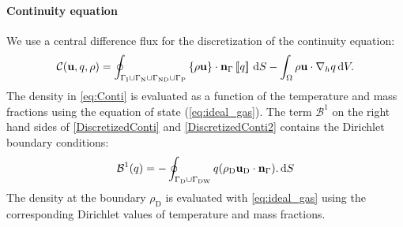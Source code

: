 \paragraph{Continuity equation}
We use a central difference flux for the discretization of the continuity equation:
\begin{equation}
	\mathcal{C}(\textbf{u},q, \rho)  =  \oint_{\Gamma_{\text{I}} \cup\Gamma_{\text{N}}\cup \Gamma_{\text{ND}}\cup \Gamma_{\text{P}}}{\left\{{\rho\textbf{u} }\right\}\cdot \textbf{n}_\Gamma\left[\!\left[{{q}}\right]\!\right] \,\mathrm{d} S} - \int_{\Omega}{\rho \textbf{u}\cdot \nabla_h q} \,\mathrm{d} V.  \label{eq:Conti}
\end{equation}
The density in \cref{eq:Conti} is evaluated as a function of the temperature and mass fractions using the equation of state (\cref{eq:ideal_gas}). The term $\mathcal{B}^1$ on the right hand sides of \cref{DiscretizedConti} and \cref{DiscretizedConti2}  contains the Dirichlet boundary conditions:
\begin{equation}
	\mathcal{B}^1(q) =  -\oint_{\Gamma_{\text{D}}\cup \Gamma_{\text{DW}}}{q(\rho_{\text{D}} \textbf{u}_{\text{D}} \cdot \textbf{n}_{\Gamma}). \,\mathrm{d} S}
\end{equation}
The density at the boundary  $\rho_{\text{D}}$ is evaluated with \cref{eq:ideal_gas} using the corresponding Dirichlet values of temperature and mass fractions.
